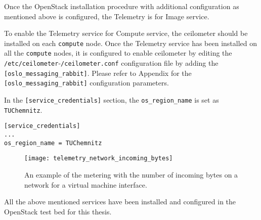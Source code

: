 Once the OpenStack installation procedure with additional configuration as mentioned above is configured, the Telemetry is for Image service.

To enable the Telemetry service for Compute service, the ceilometer should be installed on each \verb|compute| node.
Once the Telemetry service has been installed on all the \verb|compute| nodes, it is configured to enable ceilometer by editing the \verb|/etc/ceilometer|-\verb|/ceilometer.conf| configuration file by adding the \verb|[oslo_messaging_rabbit]|.
Please refer to Appendix  for the \verb|[oslo_messaging_rabbit]| configuration parameters.


In the \verb|[service_credentials]| section, the \verb|os_region_name| is set as \verb|TUChemnitz|.
\begin{lstlisting}[frame=single]
[service_credentials]
...
os_region_name = TUChemnitz
\end{lstlisting}


\begin{figure}[H]
  \centering
  \texttt{[image: telemetry\_network\_incoming\_bytes]}
  \caption{An example of the metering with the number of incoming bytes on a network for a virtual machine interface.}\label{fig:telemetry_network_incoming_bytes}
\end{figure}

All the above mentioned services have been installed and configured in the OpenStack test bed for this thesis.




